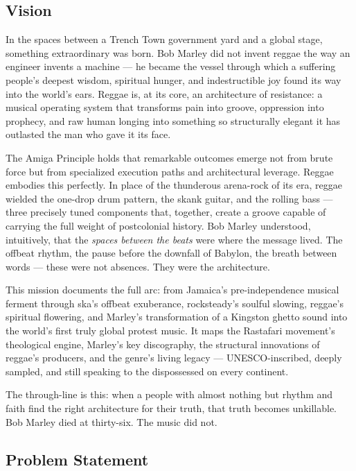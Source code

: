\documentclass[11pt,letterpaper]{article}
\begin{document}
\subsection{Vision}

In the spaces between a Trench Town government yard and a global stage, something extraordinary was born. Bob Marley did not invent reggae the way an engineer invents a machine --- he became the vessel through which a suffering people's deepest wisdom, spiritual hunger, and indestructible joy found its way into the world's ears. Reggae is, at its core, an architecture of resistance: a musical operating system that transforms pain into groove, oppression into prophecy, and raw human longing into something so structurally elegant it has outlasted the man who gave it its face.

The Amiga Principle holds that remarkable outcomes emerge not from brute force but from specialized execution paths and architectural leverage. Reggae embodies this perfectly. In place of the thunderous arena-rock of its era, reggae wielded the one-drop drum pattern, the skank guitar, and the rolling bass --- three precisely tuned components that, together, create a groove capable of carrying the full weight of postcolonial history. Bob Marley understood, intuitively, that the \textit{spaces between the beats} were where the message lived. The offbeat rhythm, the pause before the downfall of Babylon, the breath between words --- these were not absences. They were the architecture.

This mission documents the full arc: from Jamaica's pre-independence musical ferment through ska's offbeat exuberance, rocksteady's soulful slowing, reggae's spiritual flowering, and Marley's transformation of a Kingston ghetto sound into the world's first truly global protest music. It maps the Rastafari movement's theological engine, Marley's key discography, the structural innovations of reggae's producers, and the genre's living legacy --- UNESCO-inscribed, deeply sampled, and still speaking to the dispossessed on every continent.

The through-line is this: when a people with almost nothing but rhythm and faith find the right architecture for their truth, that truth becomes unkillable. Bob Marley died at thirty-six. The music did not.

\subsection{Problem Statement}
\end{document}
